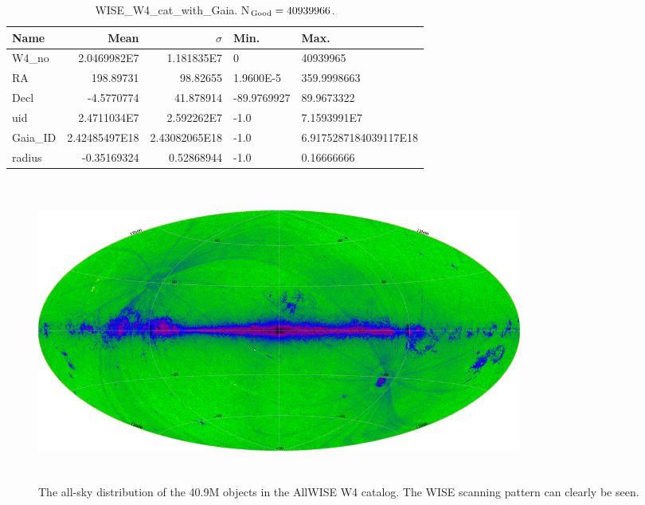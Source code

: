 \documentclass[usenatbib]{mn2e}
\begin{document}
\begin{table}
\begin{centering}
\begin{tabular}{l r r l l }
\hline
\hline
  Name &  Mean & $\sigma$ & Min. & Max. \\
\hline
  W4\_no   & 2.0469982E7 & 1.181835E7 & 0 & 40939965 \\
  RA           & 198.89731 & 98.82655 & 1.9600E-5 & 359.9998663 \\
  Decl         & -4.5770774 & 41.878914 & -89.9769927 & 89.9673322 \\ 
  uid           & 2.4711034E7 & 2.592262E7 & -1.0 & 7.1593991E7 \\
  Gaia\_ID  & 2.42485497E18 & 2.43082065E18 & -1.0 & 6.9175287184039117E18 \\
  radius      & -0.35169324 & 0.52868944 & -1.0 & 0.16666666 \\
\hline
\hline
\end{tabular}
      \label{tab:stats}
\caption{WISE\_W4\_cat\_with\_Gaia. N$_{\rm Good}=40939966$.}
\end{centering}
\end{table}








\begin{figure}
    \includegraphics[height=10.0cm,width=16.0cm]
    {../../Gaia/plots/WISE_W4_DetBitge8_Aittoff_Galactic.png}
    \caption[The all-sky distribution of the 40.9M objects in the AllWISE W4 catalog.]
    {The all-sky distribution of the 40.9M objects in the AllWISE W4 catalog.
    The WISE scanning pattern can clearly be seen.}
    \label{fig:fig1}
\end{figure}
\end{document}
